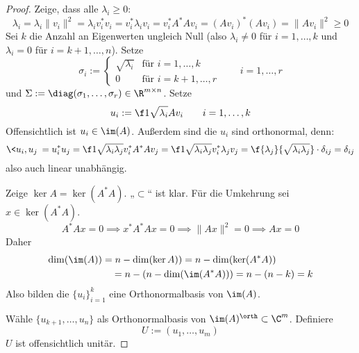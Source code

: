 \documentclass[11pt]{scrbook}
\begin{document}
\begin{st}
\begin{proof}
		Zeige, dass alle $\lambda_i \ge 0$:
		\[
			\lambda_i = \lambda_i \|v_i\|^2 = \lambda_iv_i^*v_i = v_i^* \lambda_i v_i = v_i^* A^*A v_i = (A v_i)^*(A v_i) =  \|Av_i\|^2 \ge 0
		\]
		Sei $k$ die Anzahl an Eigenwerten ungleich Null (also $\lambda_i \neq 0$ für $i=1,\dotsc,k$ und $\lambda_i=0$ für $i=k+1,\dotsc,n$).
		Setze 
		\[
			\sigma_i := \begin{cases}
				\sqrt{\lambda_i} & \text{für $i=1,\dotsc,k$} \\
				0 & \text{für $i=k+1,\dotsc, r$}
			\end{cases}
			\qquad i = 1,\dotsc,r
		\]
		und $\Sigma := \diag(\sigma_1,\dotsc,\sigma_r) \in \R^{m\times n}$.
		Setze 
		\[
			u_i := \f 1{\sqrt{\lambda_i}}Av_i
			\qquad i = 1,\dotsc, k
		\]
		Offensichtlich ist $u_i\in \im(A)$.
		Außerdem sind die $u_i$ sind orthonormal, denn:
		\[
			\<u_i,u_j\> 
			= u_i^*u_j 
			= \f 1{\sqrt{\lambda_i \lambda_j}} v_i^* A^*Av_j
			= \f 1{\sqrt{\lambda_i\lambda_j}}v_i^* \lambda_j v_j
			= \f {\lambda_j} {\sqrt{\lambda_i \lambda_j}}\cdot \delta_{ij} 
			= \delta_{ij}
		\]
		also auch linear unabhängig.

		Zeige $\ker A = \ker (A^*A)$.
		„$\subset$“ ist klar.
		Für die Umkehrung sei $x\in \ker (A^* A)$.
		\[
			A^*A x = 0 \implies x^*A^*Ax = 0 \implies \|Ax\|^2 = 0 \implies Ax=0
		\]
		Daher
		\begin{align*}
			\dim(\im(A)) 
			&= n - \dim (\ker A)) 
			= n-\dim (\ker(A^*A))  \\
			&\quad = n- (n- \dim(\im(A^*A))) 
			= n-(n-k) = k
		\end{align*}
		Also bilden die $\{u_i\}_{i=1}^k$ eine Orthonormalbasis von $\im(A)$.

		Wähle $\{u_{k+1},\dotsc, u_n\}$ als Orthonormalbasis von $\im( A)^\orth \subset \C^m$.
		Definiere 
		\[
			U := (u_1,\dotsc, u_m)
		\]
		$U$ ist offensichtlich unitär.


\end{proof}
\end{st}
\end{document}
